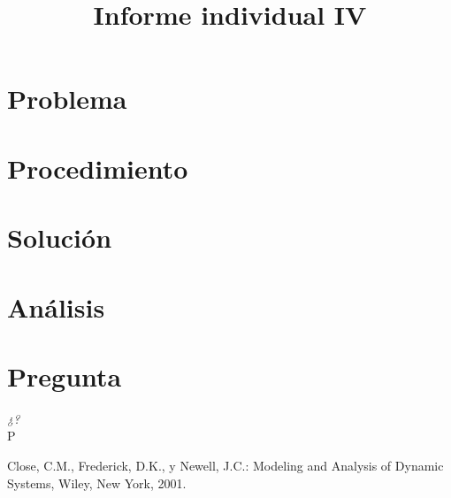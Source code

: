 \documentclass[conference]{IEEEtran}
\begin{document}
\title{Informe individual IV}


\author{
}

\maketitle

\section{Problema}


\section{Procedimiento}


\section{Solución}


\section{Análisis}


\section{Pregunta}
\textit{¿?}\\
P


\begin{thebibliography}{00}
 Close, C.M., Frederick, D.K., y Newell, J.C.: Modeling and Analysis
of Dynamic Systems, Wiley, New York, 2001.
\end{thebibliography}
\end{document}
